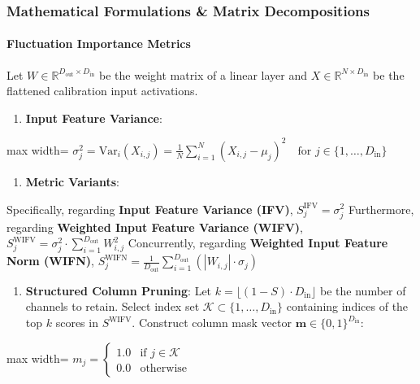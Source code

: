 \subsubsection*{Mathematical Formulations \& Matrix Decompositions}

\paragraph{Fluctuation Importance Metrics}

Let $W \in \mathbb{R}^{D_{\text{out}} \times D_{\text{in}}}$ be the weight matrix of a linear layer and $X \in \mathbb{R}^{N \times D_{\text{in}}}$ be the flattened calibration input activations.

\begin{enumerate}
\item \textbf{Input Feature Variance}:
\end{enumerate}
\begin{center}
\begin{adjustbox}{max width=\columnwidth}
$\displaystyle
\sigma_j^2 = \text{Var}_i(X_{i, j}) = \frac{1}{N} \sum_{i=1}^N \left( X_{i, j} - \mu_j \right)^2 \quad \text{for } j \in \{1, \dots, D_{\text{in}}\}
$
\end{adjustbox}
\end{center}

\begin{enumerate}
\item \textbf{Metric Variants}:
\end{enumerate}
Specifically, regarding \textbf{Input Feature Variance (IFV)}, $\displaystyle S_j^{\text{IFV}} = \sigma_j^2$ Furthermore, regarding \textbf{Weighted Input Feature Variance (WIFV)}, $\displaystyle S_j^{\text{WIFV}} = \sigma_j^2 \cdot \sum_{i=1}^{D_{\text{out}}} W_{i, j}^2$ Concurrently, regarding \textbf{Weighted Input Feature Norm (WIFN)}, $\displaystyle S_j^{\text{WIFN}} = \frac{1}{D_{\text{out}}} \sum_{i=1}^{D_{\text{out}}} \left( |W_{i, j}| \cdot \sigma_j \right)$


\begin{enumerate}
\item \textbf{Structured Column Pruning}:
Let $k = \lfloor (1 - S) \cdot D_{\text{in}} \rfloor$ be the number of channels to retain. Select index set $\mathcal{K} \subset \{1, \dots, D_{\text{in}}\}$ containing indices of the top $k$ scores in $S^{\text{WIFV}}$. Construct column mask vector $\mathbf{m} \in \{0, 1\}^{D_{\text{in}}}$:

\end{enumerate}
\begin{center}
\begin{adjustbox}{max width=\columnwidth}
$\displaystyle
m_j = \begin{cases} 1.0 & \text{if } j \in \mathcal{K} \\ 0.0 & \text{otherwise} \end{cases}
$
\end{adjustbox}
\end{center}

